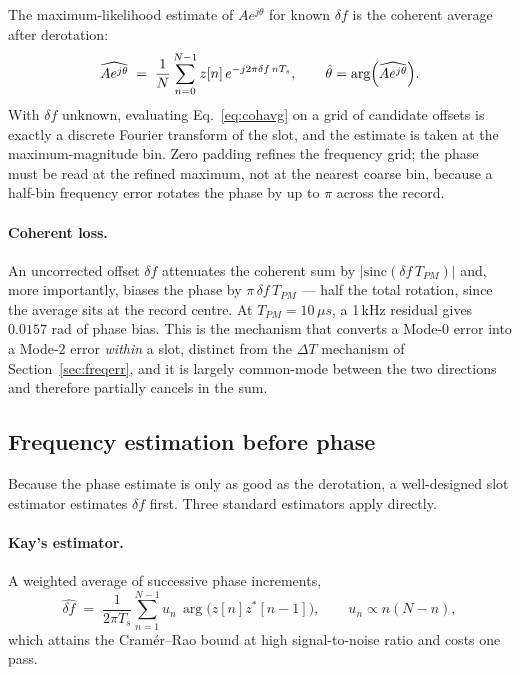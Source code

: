 \documentclass[11pt,a4paper]{article}
\newcommand{\us}{\,\ensuremath{\upmu}s}
\newcommand{\Tpm}{T_{PM}}
\providecommand{\upmu}{\mu}
\begin{document}
The maximum-likelihood estimate of $Ae^{j\theta}$ for known $\delta f$ is the coherent average after
derotation:
\begin{equation}
\widehat{Ae^{j\theta}} \;=\; \frac{1}{N}\sum_{n=0}^{N-1} z[n]\, e^{-j2\pi \delta f\, n T_s},
\qquad
\hat\theta = \arg\Bigl(\widehat{Ae^{j\theta}}\Bigr).
\label{eq:cohavg}
\end{equation}
With $\delta f$ unknown, evaluating Eq.~\eqref{eq:cohavg} on a grid of candidate offsets is exactly a
discrete Fourier transform of the slot, and the estimate is taken at the maximum-magnitude bin. Zero
padding refines the frequency grid; the phase must be read at the refined maximum, not at the nearest
coarse bin, because a half-bin frequency error rotates the phase by up to $\pi$ across the record.

\paragraph{Coherent loss.} An uncorrected offset $\delta f$ attenuates the coherent sum by
$|\mathrm{sinc}(\delta f\,\Tpm)|$ and, more importantly, biases the phase by
$\pi\,\delta f\,\Tpm$ --- half the total rotation, since the average sits at the record centre. At
$\Tpm = 10\us$, a 1\,kHz residual gives $0.0157$ rad of phase bias. This is the mechanism that
converts a Mode-0 error into a Mode-2 error \emph{within} a slot, distinct from the
$\Delta T$ mechanism of Section~\ref{sec:freqerr}, and it is largely common-mode between the two
directions and therefore partially cancels in the sum.

\subsection{Frequency estimation before phase}

Because the phase estimate is only as good as the derotation, a well-designed slot estimator
estimates $\delta f$ first. Three standard estimators apply directly.

\paragraph{Kay's estimator.} A weighted average of successive phase increments,
\begin{equation}
\widehat{\delta f} \;=\; \frac{1}{2\pi T_s}\sum_{n=1}^{N-1} u_n\,
   \arg\bigl(z[n]z^{*}[n-1]\bigr),
\qquad
u_n \propto n(N-n),
\label{eq:kay}
\end{equation}
which attains the Cram\'er--Rao bound at high signal-to-noise ratio and costs one pass.
\end{document}
